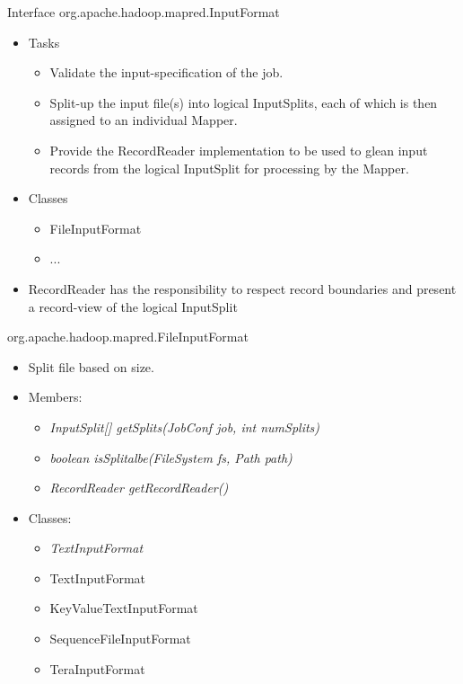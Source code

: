 \documentclass{beamer}
\begin{document}
\begin{frame}{Interface org.apache.hadoop.mapred.InputFormat}
    \begin{itemize}
    \item Tasks
        \begin{itemize}
        \item Validate the input-specification of the job.
        \item Split-up the input file(s) into logical InputSplits, each of which is then assigned to an individual Mapper.
        \item Provide the RecordReader implementation to be used to glean input records from the logical InputSplit for processing by the Mapper.
        \end{itemize}
    \item Classes
        \begin{itemize}
        \item FileInputFormat
        \item ...
        \end{itemize}
    \item RecordReader has the responsibility to respect record boundaries and present a record-view of the logical InputSplit
    \end{itemize}
\end{frame}

\begin{frame}{org.apache.hadoop.mapred.FileInputFormat}
    \begin{itemize}
    \item Split file based on size.
    \item Members:
        \begin{itemize}
        \item \em{InputSplit[] getSplits(JobConf job, int numSplits)}
        \item \em{boolean isSplitalbe(FileSystem fs, Path path)}
        \item \em{RecordReader getRecordReader()}
        \end{itemize}
    \item Classes: 
        \begin{itemize}
        \item \em{TextInputFormat}
        \item TextInputFormat
        \item KeyValueTextInputFormat
        \item SequenceFileInputFormat
        \item TeraInputFormat
        \end{itemize}
    \end{itemize}
\end{frame}
\end{document}
